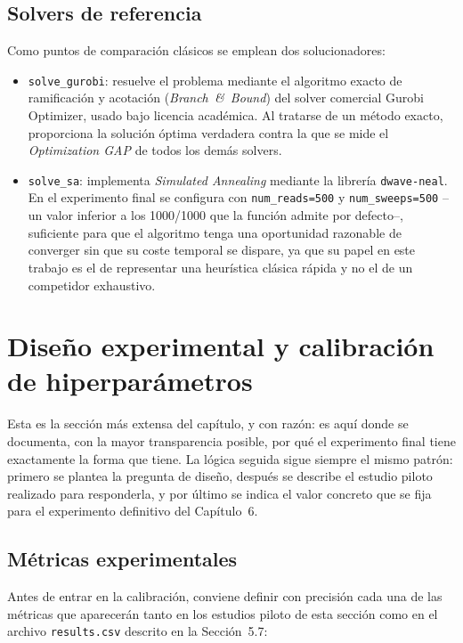 \subsection{Solvers de referencia}

Como puntos de comparación clásicos se emplean dos solucionadores:

\begin{itemize}
    \item \texttt{solve\_gurobi}: resuelve el problema mediante el algoritmo exacto de ramificación y acotación (\textit{Branch~\&~Bound}) del solver comercial Gurobi Optimizer, usado bajo licencia académica. Al tratarse de un método exacto, proporciona la solución óptima verdadera contra la que se mide el \textit{Optimization GAP} de todos los demás solvers.
    \item \texttt{solve\_sa}: implementa \textit{Simulated Annealing} mediante la librería \texttt{dwave-neal}. En el experimento final se configura con \texttt{num\_reads=500} y \texttt{num\_sweeps=500} --un valor inferior a los 1000/1000 que la función admite por defecto--, suficiente para que el algoritmo tenga una oportunidad razonable de converger sin que su coste temporal se dispare, ya que su papel en este trabajo es el de representar una heurística clásica rápida y no el de un competidor exhaustivo.
\end{itemize}

\section{Diseño experimental y calibración de hiperparámetros}
\label{sec:calibracion}

Esta es la sección más extensa del capítulo, y con razón: es aquí donde se documenta, con la mayor transparencia posible, por qué el experimento final tiene exactamente la forma que tiene. La lógica seguida sigue siempre el mismo patrón: primero se plantea la pregunta de diseño, después se describe el estudio piloto realizado para responderla, y por último se indica el valor concreto que se fija para el experimento definitivo del Capítulo~6.

\subsection{Métricas experimentales}

Antes de entrar en la calibración, conviene definir con precisión cada una de las métricas que aparecerán tanto en los estudios piloto de esta sección como en el archivo \texttt{results.csv} descrito en la Sección~5.7:

